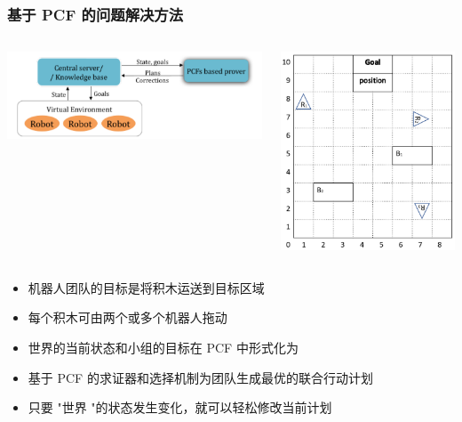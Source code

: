 \documentclass[10pt]{beamer}
\begin{document}
\begin{frame}[fragile]
  \frametitle{基于 PCF 的问题解决方法}
   \begin{columns}
     \begin{column}{0.6\textwidth}
       \includegraphics[width=\linewidth]{pcf-robo-planning.pdf}
     \end{column}
     \begin{column}{0.3\textwidth}
       \includegraphics[width=\linewidth]{pcf-room.png}
     \end{column}
   \end{columns}
   \begin{itemize}
   \item 机器人团队的目标是将积木运送到目标区域
   \item 每个积木可由两个或多个机器人拖动
   \item 世界的当前状态和小组的目标在 PCF 中形式化为
   \item 基于 PCF 的求证器和选择机制为团队生成最优的联合行动计划
   \item 只要 "世界 "的状态发生变化，就可以轻松修改当前计划
   \end{itemize}
 \end{frame}
\end{document}
